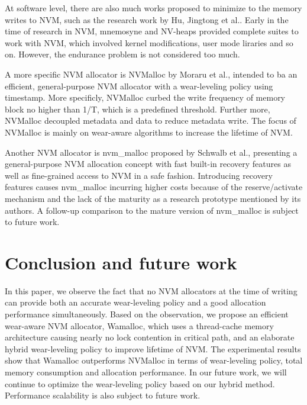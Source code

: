 \documentclass[10pt, conference, compsocconf]{IEEEtran}
\begin{document}
At software level, there are also much works proposed to minimize to the memory writes to NVM, 
such as the research work by Hu, Jingtong et al.\cite{hu2013software}.
Early in the time of research in NVM, 
mnemosyne\cite{volos2011mnemosyne} and NV-heaps\cite{coburn2011nv} provided complete suites to work with NVM, 
which involved kernel modifications, user mode liraries and so on.
However, the endurance problem is not considered too much.

A more specific NVM allocator is NVMalloc by Moraru et al.\cite{moraru2013consistent},
intended to ba an efficient, general-purpose NVM allocator with a wear-leveling policy using timestamp.
More specificly, NVMalloc curbed the write frequency of memory block no higher than 1/T, which is a predefined threshold.
Further more, NVMalloc decoupled metadata and data to reduce metadata write.
The focus of NVMalloc is mainly on wear-aware algorithms to increase the lifetime of NVM.

Another NVM allocator is nvm\_malloc proposed by Schwalb et al.\cite{schwalbnvm},
presenting a general-purpose NVM allocation concept with fast built-in recovery features
as well as fine-grained access to NVM in a safe fashion.
Introducing recovery features causes nvm\_malloc incurring higher costs
because of the reserve/activate mechanism and the lack of the maturity as a research prototype mentioned by its authors.
A follow-up comparison to the mature version of nvm\_malloc is subject to future work.

\section{Conclusion and future work}

In this paper, we observe the fact that
no NVM allocators at the time of writing 
can provide both an accurate wear-leveling policy and a good allocation performance simultaneously.
Based on the observation, we propose an efficient wear-aware NVM allocator, Wamalloc,
which uses a thread-cache memory architecture causing nearly no lock contention in critical path,
and an elaborate hybrid wear-leveling policy to improve lifetime of NVM.
The experimental results show that
Wamalloc outperforms NVMalloc in terms of wear-leveling policy, total memory consumption and allocation performance.
In our future work, we will continue to optimize the wear-leveling policy based on our hybrid method.
Performance scalability is also subject to future work.
\end{document}
